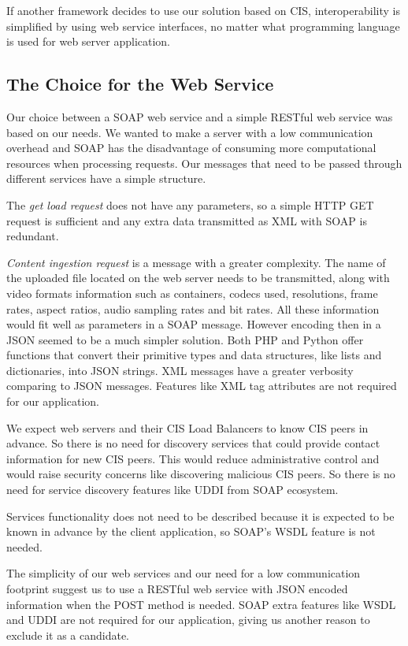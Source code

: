 If another framework decides to use our solution based on CIS, interoperability is simplified by using web service interfaces, no matter what programming language is used for web server application.

\subsection{The Choice for the Web Service}
\label{subsec:securing-cis}

Our choice between a SOAP web service and a simple RESTful web service was based on our needs. We wanted to make a server with a low communication overhead and SOAP has the disadvantage of consuming more computational resources when processing requests. Our messages that need to be passed through different services have a simple structure. 

The \textit{get load request} does not have any parameters, so a simple HTTP GET request is sufficient and any extra data transmitted as XML with SOAP is redundant.

\textit{Content ingestion request} is a message with a greater complexity. The name of the uploaded file located on the web server needs to be transmitted, along with video formats information such as containers, codecs used, resolutions, frame rates, aspect ratios, audio sampling rates and bit rates. All these information would fit well as parameters in a SOAP message. However encoding then in a JSON seemed to be a much simpler solution. Both PHP and Python offer functions that convert their primitive types and data structures, like lists and dictionaries, into JSON strings. XML messages have a greater verbosity comparing to JSON messages. Features like XML tag attributes are not required for our application.

We expect web servers and their CIS Load Balancers to know CIS peers in advance. So there is no need for discovery services that could provide contact information for new CIS peers. This would reduce administrative control and would raise security concerns like discovering malicious CIS peers. So there is no need for service discovery features like UDDI from SOAP ecosystem.

Services functionality does not need to be described because it is expected to be known in advance by the client application, so SOAP's WSDL feature is not needed.

The simplicity of our web services and our need for a low communication footprint suggest us to use a RESTful web service with JSON encoded information when the POST method is needed. SOAP extra features like WSDL and UDDI are not required for our application, giving us another reason to exclude it as a candidate.


